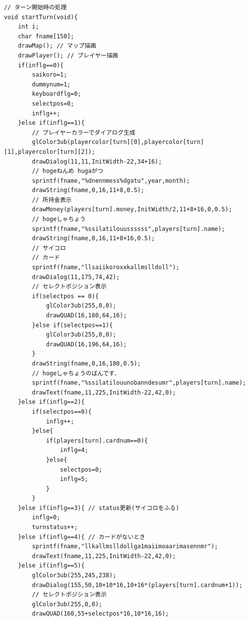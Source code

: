 \documentclass[a4j]{jarticle}
\begin{document}
        \begin{lstlisting}[basicstyle=\ttfamily\footnotesize, frame=single,label=startTurn,caption=startTurn関数]
// ターン開始時の処理
void startTurn(void){
    int i;
    char fname[150];
    drawMap(); // マップ描画
    drawPlayer(); // プレイヤー描画
    if(inflg==0){
        saikoro=1;
        dummynum=1;
        keyboardflg=0;
        selectpos=0;
        inflg++;
    }else if(inflg==1){
        // プレイヤーカラーでダイアログ生成
        glColor3ub(playercolor[turn][0],playercolor[turn][1],playercolor[turn][2]);
        drawDialog(11,11,InitWidth-22,34+16);
        // hogeねんめ hugaがつ
        sprintf(fname,"%dnennmess%dgatu",year,month);
        drawString(fname,0,16,11+8,0.5);
        // 所持金表示
        drawMoney(players[turn].money,InitWidth/2,11+8+16,0,0.5);
        // hogeしゃちょう
        sprintf(fname,"%ssilatilouussssss",players[turn].name);
        drawString(fname,0,16,11+8+16,0.5);   
        // サイコロ
        // カード
        sprintf(fname,"llsaiikoroxxkallmslldoll");
        drawDialog(11,175,74,42);
        // セレクトポジション表示
        if(selectpos == 0){
            glColor3ub(255,0,0);
            drawQUAD(16,180,64,16);                 
        }else if(selectpos==1){
            glColor3ub(255,0,0);
            drawQUAD(16,196,64,16);               
        }   
        drawString(fname,0,16,180,0.5);
        // hogeしゃちょうのばんです．
        sprintf(fname,"%ssilatilouunobanndesumr",players[turn].name);
        drawText(fname,11,225,InitWidth-22,42,0);      
    }else if(inflg==2){
        if(selectpos==0){
            inflg++;
        }else{
            if(players[turn].cardnum==0){
                inflg=4;
            }else{
                selectpos=0;
                inflg=5;
            }
        }
    }else if(inflg==3){ // status更新(サイコロをふる)
        inflg=0;
        turnstatus++;
    }else if(inflg==4){ // カードがないとき
        sprintf(fname,"llkallmslldollga1maiimoaarimasennmr");
        drawText(fname,11,225,InitWidth-22,42,0);               
    }else if(inflg==5){
        glColor3ub(255,245,238);
        drawDialog(155,50,10+10*16,10+16*(players[turn].cardnum+1));
        // セレクトポジション表示
        glColor3ub(255,0,0);
        drawQUAD(160,55+selectpos*16,10*16,16);                 
        

\end{lstlisting}
\end{document}
